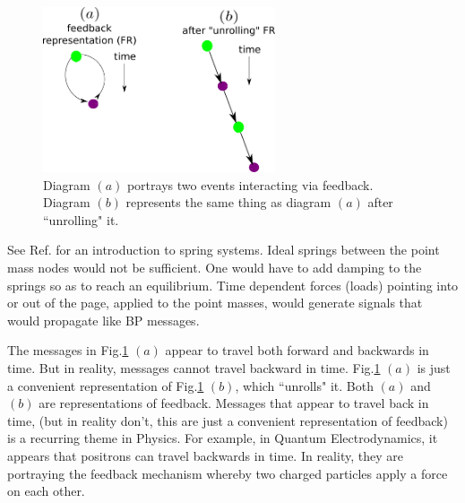 \begin{figure}[h!]
\centering
\includegraphics[width=2.7in]
{mpass/time-travel.png}
\caption{Diagram $(a)$ portrays two events interacting via feedback. Diagram $(b)$
represents the same thing as diagram $(a)$
after ``unrolling" it.}
\label{fig-time-travel}
\end{figure}

See Ref.\cite{wiki-spring-net}
for an introduction to spring systems.
Ideal springs between the point mass
nodes would
not be sufficient.
One would have to add damping to
the springs so as
to reach an equilibrium.
Time dependent forces (loads)
pointing into or out of the page, applied
to the point masses, would
generate signals that would
propagate
like BP messages.


The messages in Fig.\ref{fig-time-travel} $(a)$ 
appear to travel both forward and backwards in time.
But in reality, messages cannot travel backward in time.  Fig.\ref{fig-time-travel} $(a)$
is just a convenient representation of 
Fig.\ref{fig-time-travel} $(b)$, which ``unrolls" it. Both $(a)$ and $(b)$ are representations of feedback.
Messages that appear to travel back in time,
(but in reality don't, this are just a convenient 
representation of feedback) 
is a recurring theme in Physics. For example,
in Quantum Electrodynamics, it appears that positrons can travel backwards in time.  In reality,
they are portraying the feedback mechanism whereby two
charged
particles
apply a force on each other.



